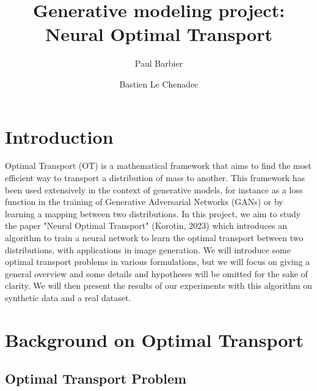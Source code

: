 \documentclass[11pt]{article}
\title{Generative modeling project: Neural Optimal Transport}
\author[1]{Paul Barbier}
\author[1]{Bastien Le Chenadec}
\affil[1]{École des Ponts ParisTech, Master MVA}
\begin{document}
\maketitle

\section{Introduction}

Optimal Transport (OT) is a mathematical framework that aims to find the most efficient way to transport a distribution of mass to another. This framework has been used extensively in the context of generative models, for instance as a loss function in the training of Generative Adversarial Networks (GANs) or by learning a mapping between two distributions. In this project, we aim to study the paper "Neural Optimal Transport" (Korotin, 2023) \cite{korotin-2022} which introduces an algorithm to train a neural network to learn the optimal transport between two distributions, with applications in image generation. We will introduce some optimal transport problems in various formulations, but we will focus on giving a general overview and some details and hypotheses will be omitted for the sake of clarity. We will then present the results of our experiments with this algorithm on synthetic data and a real dataset.

\section{Background on Optimal Transport}

\subsection{Optimal Transport Problem}
\end{document}
